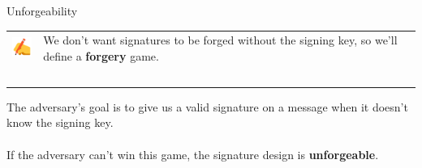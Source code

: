 \documentclass[aspectratio=169]{beamer}
\begin{document}
\begin{frame}{Unforgeability}
    \begin{tabular}{>{\arraybackslash}m{40px} >{\arraybackslash}m{320px}}
        \includegraphics[width=30px]{images/pen.png} & We don't want signatures to be forged without the signing key, so we'll define a \textbf{forgery} game. \\~\\
    \end{tabular}

    The adversary's goal is to give us a valid signature on a message when it doesn't know the signing key. \\~\\

    If the adversary can't win this game, the signature design is \textbf{unforgeable}.
\end{frame}
\end{document}
